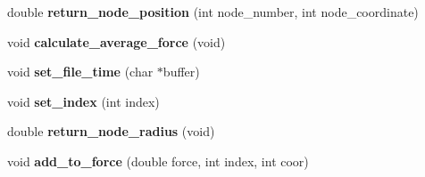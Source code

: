 \begin{DoxyCompactItemize}
\item 
double {\bfseries return\+\_\+node\+\_\+position} (int node\+\_\+number, int node\+\_\+coordinate)\hypertarget{classChromatin_a90039618de9196e41f9c77de1b5fce0e}{}\label{classChromatin_a90039618de9196e41f9c77de1b5fce0e}

\item 
void {\bfseries calculate\+\_\+average\+\_\+force} (void)\hypertarget{classChromatin_aa3e429b42938181fcd2fa156468c4b29}{}\label{classChromatin_aa3e429b42938181fcd2fa156468c4b29}

\item 
void {\bfseries set\+\_\+file\+\_\+time} (char $\ast$buffer)\hypertarget{classChromatin_a3187fb5d0aacdf6109af3bbb85a66aa9}{}\label{classChromatin_a3187fb5d0aacdf6109af3bbb85a66aa9}

\item 
void {\bfseries set\+\_\+index} (int index)\hypertarget{classChromatin_a58851cf29ad04948463857c99103ccd2}{}\label{classChromatin_a58851cf29ad04948463857c99103ccd2}

\item 
double {\bfseries return\+\_\+node\+\_\+radius} (void)\hypertarget{classChromatin_a6b3dc72635d71b50654ba6106d6c3b25}{}\label{classChromatin_a6b3dc72635d71b50654ba6106d6c3b25}

\item 
void {\bfseries add\+\_\+to\+\_\+force} (double force, int index, int coor)\hypertarget{classChromatin_a5bc9c714d620b6cd1f3b3a6d85dbd1d8}{}\label{classChromatin_a5bc9c714d620b6cd1f3b3a6d85dbd1d8}

\end{DoxyCompactItemize}
